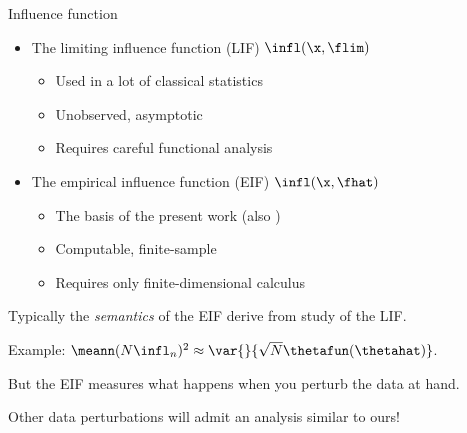 \begin{frame}[t]{Influence function}

\begin{itemize}
%
\item The limiting influence function (LIF) $\infl(\x, \flim)$
    \begin{itemize}
        \item Used in a lot of classical statistics
            \parencite{
                mises1947asymptotic,
                huber1981robust, hampel1986robustbook,
                bickel1993semiparametric}
        \item Unobserved, asymptotic
        \item Requires careful functional analysis
            \parencite{reeds1976thesis}
    \end{itemize}
\item The empirical influence function (EIF) $\infl(\x, \fhat)$
    \begin{itemize}
        \item The basis of the present work
            (also \parencite{giordano2019swiss, giordano2019higherorder})
        \item Computable, finite-sample
        \item Requires only finite-dimensional calculus
    \end{itemize}
%
\end{itemize}

\vspace{1em}
Typically the {\em semantics} of the EIF derive from study of the LIF.

Example: $\meann (N \infl_n)^2 \approx \var{}{\sqrt{N}\thetafun(\thetahat)}$.

\vspace{1em}
But the EIF measures what happens when you perturb the data at hand.

\vspace{1em}
Other data perturbations will admit an analysis similar to ours!

\end{frame}





